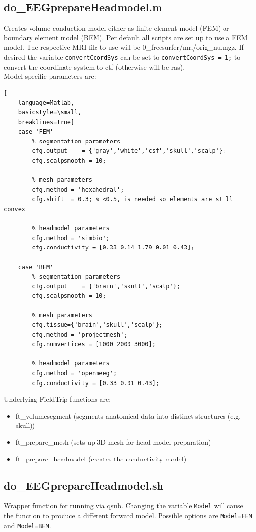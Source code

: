 \documentclass[12pt,a4paper]{scrartcl}
\begin{document}
\subsection{do\_EEGprepareHeadmodel.m}
\label{m:prepHM}
Creates volume conduction model either as finite-element model (FEM) or boundary element model (BEM). Per default all scripts are set up to use a FEM model. The respective MRI file to use will be 0\_freesurfer/mri/orig\_nu.mgz. If desired the variable \texttt{convertCoordSys} can be set to \texttt{convertCoordSys = 1;} to convert the coordinate system to ctf (otherwise will be ras).\\

Model specific parameters are:
\begin{lstlisting}[
    language=Matlab,
    basicstyle=\small,
    breaklines=true]
    case 'FEM'
        % segmentation parameters
        cfg.output    = {'gray','white','csf','skull','scalp'};
        cfg.scalpsmooth = 10;

        % mesh parameters
        cfg.method = 'hexahedral';
        cfg.shift  = 0.3; % <0.5, is needed so elements are still convex

        % headmodel parameters
        cfg.method = 'simbio';
        cfg.conductivity = [0.33 0.14 1.79 0.01 0.43];

    case 'BEM'
        % segmentation parameters
        cfg.output    = {'brain','skull','scalp'};
        cfg.scalpsmooth = 10;

        % mesh parameters
        cfg.tissue={'brain','skull','scalp'};
        cfg.method = 'projectmesh';
        cfg.numvertices = [1000 2000 3000];

        % headmodel parameters
        cfg.method = 'openmeeg';
        cfg.conductivity = [0.33 0.01 0.43];
\end{lstlisting}

Underlying FieldTrip functions are:
\begin{itemize}
\item ft\_volumesegment (segments anatomical data into distinct structures (e.g. skull))
\item ft\_prepare\_mesh (sets up 3D mesh for head model preparation)
\item ft\_prepare\_headmodel (creates the conductivity model)
\end{itemize}

\subsection{do\_EEGprepareHeadmodel.sh}
\label{sh:prepHM}
Wrapper function for running \texttt{} via qsub. Changing the variable \texttt{Model} will cause the function to produce a different forward model. Possible options are \texttt{Model=FEM} and \texttt{Model=BEM}.\\
\end{document}
